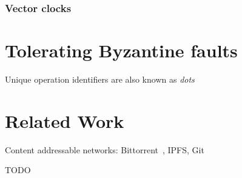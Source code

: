 \documentclass[sigplan,review]{acmart}
\begin{document}
\subsubsection{Vector clocks}


\section{Tolerating Byzantine faults}

Unique operation identifiers are also known as \emph{dots}

\section{Related Work}

Content addressable networks: Bittorrent~\cite{Pouwelse:2005}, IPFS, Git~\cite{ProGit}





\begin{acks}
TODO
\end{acks}



\end{document}
